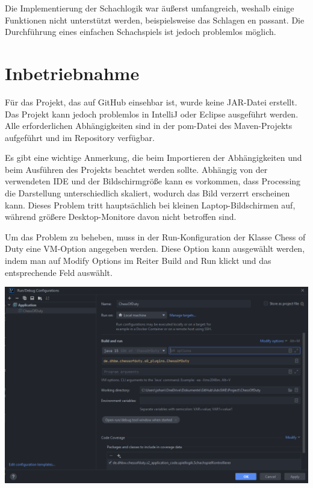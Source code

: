 Die Implementierung der Schachlogik war äußerst umfangreich, weshalb einige Funktionen nicht unterstützt werden, beispielsweise das Schlagen en passant.
Die Durchführung eines einfachen Schachspiels ist jedoch problemlos möglich.

\section{Inbetriebnahme}

Für das Projekt, das auf GitHub einsehbar ist, wurde keine JAR-Datei erstellt. 
Das Projekt kann jedoch problemlos in IntelliJ oder Eclipse ausgeführt werden. 
Alle erforderlichen Abhängigkeiten sind in der pom-Datei des Maven-Projekts aufgeführt und im Repository verfügbar.

Es gibt eine wichtige Anmerkung, die beim Importieren der Abhängigkeiten und beim Ausführen des Projekts beachtet werden sollte. 
Abhängig von der verwendeten IDE und der Bildschirmgröße kann es vorkommen, dass Processing die Darstellung unterschiedlich skaliert, wodurch das Bild verzerrt erscheinen kann.
Dieses Problem tritt hauptsächlich bei kleinen Laptop-Bildschirmen auf, während größere Desktop-Monitore davon nicht betroffen sind.

Um das Problem zu beheben, muss in der Run-Konfiguration der Klasse \glqq Chess of Duty\grqq{} eine VM-Option angegeben werden. 
Diese Option kann ausgewählt werden, indem man auf \glqq Modify Options\grqq{} im Reiter \glqq Build and Run\grqq{} klickt und das entsprechende Feld auswählt.

\begin{minipage}{\linewidth}
    \centering
    \includegraphics[scale=0.45]{Bilder/erklaerung_01.PNG}
\end{minipage}

